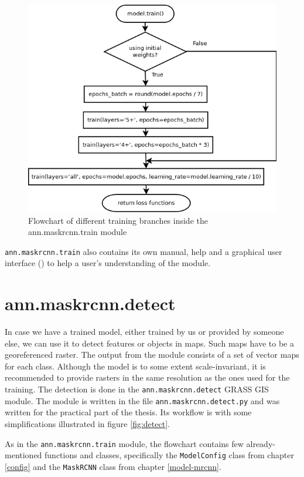 \begin{figure}[H]
   \centering
	\includegraphics[width=\linewidth]{./pictures/training_dia.png}
	\caption[ann.maskrcnn.train training flowchart]{Flowchart of different training branches inside the ann.maskrcnn.train module}
      \label{fig:training}
\end{figure}

\verb|ann.maskrcnn.train| also contains its own manual, help and a graphical 
user interface () to help a user's understanding of the module.

\section{ann.maskrcnn.detect}
\label{detect-module}

In case we have a trained model, either trained by us or provided by someone 
else, we can use it to detect features or objects in maps. Such maps have to be 
a georeferenced raster. The output from the module consists of a set of vector 
maps for each class. Although the model is to some extent scale-invariant, it is 
recommended to provide rasters in the same resolution as the ones used for the 
training. The detection is done in the \verb|ann.maskrcnn.detect| GRASS GIS 
module. The module is written in the file \verb|ann.maskrcnn.detect.py| and was 
written for the practical part of the thesis. Its workflow is with some 
simplifications illustrated in figure \ref{fig:detect}.

As in the \verb|ann.maskrcnn.train| module, the flowchart contains few 
already-mentioned functions and classes, specifically the \verb|ModelConfig| 
class from chapter \ref{config} and the \verb|MaskRCNN| class from chapter 
\ref{model-mrcnn}.

